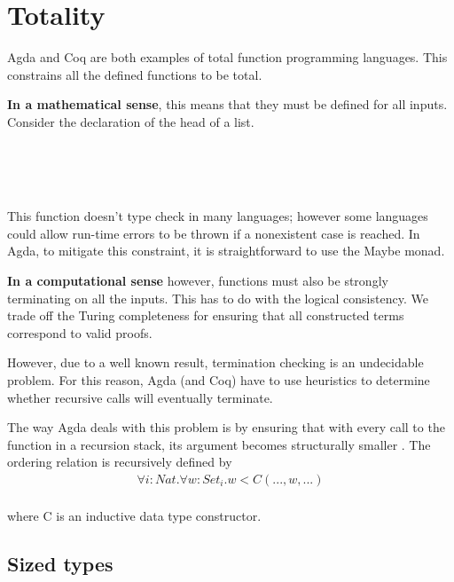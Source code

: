 \documentclass[12pt,twoside,notitlepage]{report}
\begin{document}
\section{Totality}

Agda and Coq are both examples of total function programming languages. This constrains all the defined functions to be total. 


\textbf{In a mathematical sense}, this means that they must be defined for all inputs. Consider the declaration of the head of a list.

\begin{code}
\\
\> \AgdaSymbol{:}  \AgdaSymbol{\{}\AgdaSymbol{\}}     \<%
\\
\> \AgdaSymbol{(}  \AgdaSymbol{)} \AgdaSymbol{=} \<%
\\
\end{code}

This function doesn't type check in many languages; however some languages could allow run-time errors to be thrown if a nonexistent case is reached. In Agda, to mitigate this constraint, it is straightforward to use the Maybe monad.

\textbf{In a computational sense} however, functions must also be strongly terminating on all the inputs. This has to do with the logical consistency. We trade off the Turing completeness for ensuring that all constructed terms correspond to valid proofs.

However, due to a well known result, termination checking is an undecidable problem. For this reason, Agda (and Coq) have to use heuristics to determine whether recursive calls will eventually terminate.

The way Agda deals with this problem is by ensuring that with every call to the function in a recursion stack, its argument becomes structurally smaller \cite{foetus}. The ordering relation is recursively defined by \begin{align*}
\forall i : Nat.\forall w : Set_i. w < C(...,w,...)
\end{align*}\\
where C is an inductive data type constructor.

\subsection{Sized types}
\end{document}
